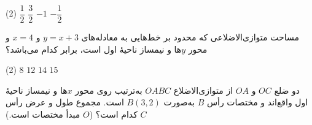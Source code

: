 \begin{moreactivities}
\noindent
\begin{minipage}[c]{0.62\textwidth}
    \raggedleft
    \begin{tasks}(2)
        \task \(\dfrac{1}{2}\)
        \task \(\dfrac{3}{2}\)
        \task \(-1\)
        \task \(-\dfrac{1}{2}\)
    \end{tasks}
\end{minipage}
\hfill
\begin{minipage}[c]{0.32\textwidth}
    \centering
\end{minipage}


\item مساحت متوازی‌الاضلاعی که محدود بر خط‌هایی به معادله‌های
$y=x+3$
و
$x=4$
و محور \(y\)ها و نیمساز ناحیۀ اول است، برابر کدام می‌باشد؟

\begin{tasks}(2)
    \task \(8\)
    \task \(12\)
    \task \(14\)
    \task \(15\)
\end{tasks}


\item دو ضلع \(OC\) و \(OA\) از متوازی‌الاضلاع \(OABC\)
به‌ترتیب روی محور \(x\)ها و نیمساز ناحیۀ اول واقع‌اند
و مختصات رأس \(B\) به‌صورت \(B(3,2)\) است.
مجموع طول و عرض رأس \(C\) کدام است؟
(\(O\) مبدأ مختصات است.)


\end{moreactivities}
